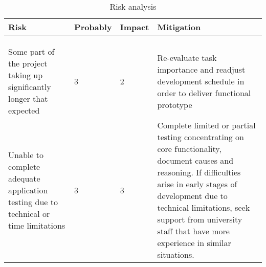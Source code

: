\def\riskaaaa{Some part of the project taking up significantly longer that expected}
\def \probabilityaaaa {3}
\def \impactaaaa {2}
\def \mitigationaaaa {Re-evaluate task importance and readjust development schedule in order to deliver functional prototype }

\def\riskaaaaa{Unable to complete adequate application testing due to technical or time limitations}
\def \probabilityaaaaa {3}
\def \impactaaaaa {3}
\def \mitigationaaaaa {Complete limited or partial testing concentrating on core functionality, document causes and reasoning. If difficulties arise in early stages of development  due to technical limitations, seek support from university staff that have more experience in similar situations. }

\begin{table}
	\centering
	\begin{tabular}{ |m{5cm}|m{2cm}|m{1cm}|m{6cm}| } 
		\hline
		Risk & Probably & Impact & Mitigation \\ 
		\hline
		\riska & \probabilitya & \impacta & \mitigationa \\ 
		\hline
		\riskaa & \probabilityaa & \impactaa & \mitigationaa \\ 
		\hline
		\riskaaa & \probabilityaaa & \impactaaa & \mitigationaaa \\ 
		\hline
		\riskaaaa & \probabilityaaaa & \impactaaaa & \mitigationaaaa \\ 
		\hline
		\riskaaaaa & \probabilityaaaaa & \impactaaaaa & \mitigationaaaaa \\ 
		\hline
	\end{tabular}
	\caption{\label{tab:risk_ana} Risk analysis}
\end{table}